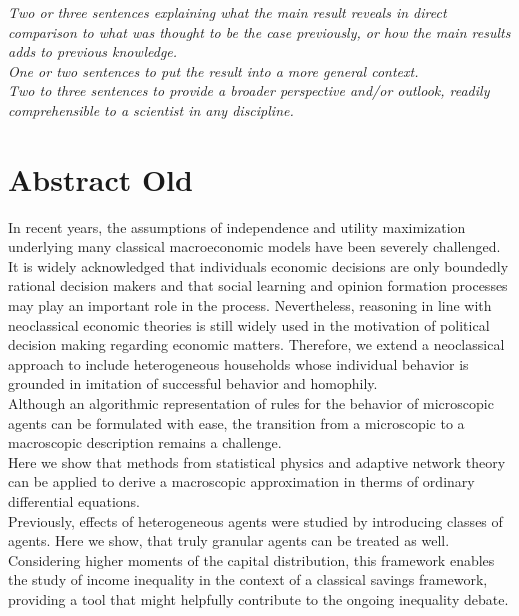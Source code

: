 \emph{Two or three sentences explaining what the main result reveals in direct comparison to what was thought to be the case previously, or how the main results adds to previous knowledge.} \\

\emph{One or two sentences to put the result into a more general context.} \\

\emph{Two to three sentences to provide a broader perspective and/or outlook, readily comprehensible to a scientist in any discipline.} \\


\section{Abstract Old}

In recent years, the assumptions of independence and utility maximization underlying many classical macroeconomic models have been severely challenged.  \\
It is widely acknowledged that individuals economic decisions are only boundedly rational decision makers and that social learning and opinion formation processes may play an important role in the process. Nevertheless, reasoning in line with neoclassical economic theories is still widely used in the motivation of political decision making regarding economic matters. Therefore, we extend a neoclassical approach to include heterogeneous households whose individual behavior is grounded in imitation of successful behavior and homophily. \\
Although an algorithmic representation of rules for the behavior of microscopic agents can be formulated with ease, the transition from a microscopic to a macroscopic description remains a challenge. \\
Here we show that methods from statistical physics and adaptive network theory can be applied to derive a macroscopic approximation in therms of ordinary differential equations. \\
Previously, effects of heterogeneous agents were studied by introducing classes of agents. Here we show, that truly granular agents can be treated as well.\\
Considering higher moments of the capital distribution, this framework enables the study of income inequality in the context of a classical savings framework, providing a tool that might helpfully contribute to the ongoing inequality debate. \\
